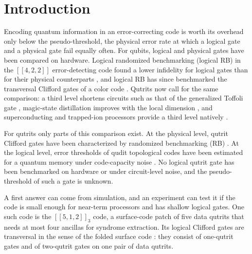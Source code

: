 \section{Introduction}\label{sec:intro}

Encoding quantum information in an error-correcting code is worth its overhead only below the pseudo-threshold, the physical error rate at which a logical gate and a physical gate fail equally often. For qubits, logical and physical gates have been compared on hardware. Logical randomized benchmarking (logical RB) in the $[[4,2,2]]$ error-detecting code found a lower infidelity for logical gates than for their physical counterparts \cite{Harper2019FTIBM}, and logical RB has since benchmarked the transversal Clifford gates of a color code \cite{Lacroix2025ColorCode}. Qutrits now call for the same comparison: a third level shortens circuits such as that of the generalized Toffoli gate \cite{Gokhale2019,Wang2020}, magic-state distillation improves with the local dimension \cite{CampbellPRX2012,CampbellPRL2014}, and superconducting and trapped-ion processors provide a third level natively \cite{Goss2024,Ringbauer2022}.

For qutrits only parts of this comparison exist. At the physical level, qutrit Clifford gates have been characterized by randomized benchmarking (RB) \cite{Morvan2021}. At the logical level, error thresholds of qudit topological codes have been estimated for a quantum memory under code-capacity noise \cite{DuclosCianci2013}. No logical qutrit gate has been benchmarked on hardware or under circuit-level noise, and the pseudo-threshold of such a gate is unknown.

A first answer can come from simulation, and an experiment can test it if the code is small enough for near-term processors and has shallow logical gates. One such code is the $[[5,1,2]]_3$ code, a surface-code patch of five data qutrits that needs at most four ancillas for syndrome extraction. Its logical Clifford gates are transversal in the sense of the folded surface code \cite{Moussa2016}: they consist of one-qutrit gates and of two-qutrit gates on one pair of data qutrits.

